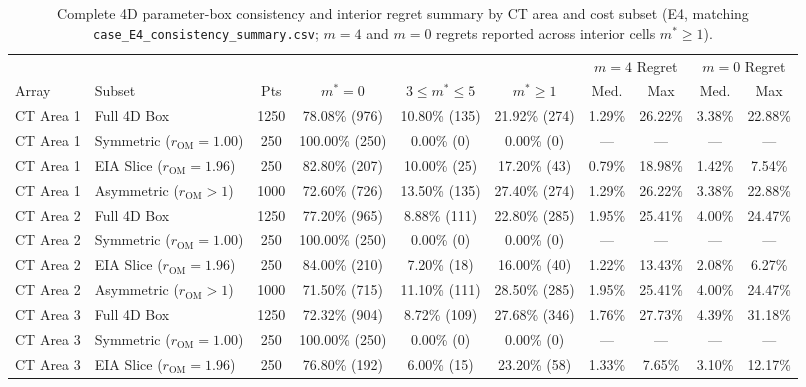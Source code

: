 \documentclass[10pt,a4paper]{article}
\begin{document}
\begin{table}[htbp]
\centering
\scriptsize
\setlength{\tabcolsep}{1.2pt}
\caption{Complete 4D parameter-box consistency and interior regret summary by CT area and cost subset (E4, matching \texttt{case\_E4\_consistency\_summary.csv}; $m=4$ and $m=0$ regrets reported across interior cells $m^* \ge 1$).}
\label{tab:S7}
\begin{tabular*}{\textwidth}{@{\extracolsep{\fill}}llcccc|cc|cc@{}}
\toprule
 & & & & & & \multicolumn{2}{c|}{$m=4$ Regret} & \multicolumn{2}{c}{$m=0$ Regret} \\
Array & Subset & Pts & $m^*=0$ & $3\le m^*\le 5$ & $m^*\ge 1$ & Med. & Max & Med. & Max \\
\midrule
CT Area 1 & Full 4D Box      & 1250 & 78.08\% (976) & 10.80\% (135) & 21.92\% (274) & 1.29\% & 26.22\% & 3.38\% & 22.88\% \\
CT Area 1 & Symmetric ($r_{\mathrm{OM}}=1.00$) & 250  & 100.00\% (250) & 0.00\% (0) & 0.00\% (0) & --- & --- & --- & --- \\
CT Area 1 & EIA Slice ($r_{\mathrm{OM}}=1.96$) & 250  & 82.80\% (207) & 10.00\% (25) & 17.20\% (43) & 0.79\% & 18.98\% & 1.42\% & 7.54\% \\
CT Area 1 & Asymmetric ($r_{\mathrm{OM}}>1$)    & 1000 & 72.60\% (726) & 13.50\% (135) & 27.40\% (274) & 1.29\% & 26.22\% & 3.38\% & 22.88\% \\
\midrule
CT Area 2 & Full 4D Box      & 1250 & 77.20\% (965) & 8.88\% (111) & 22.80\% (285) & 1.95\% & 25.41\% & 4.00\% & 24.47\% \\
CT Area 2 & Symmetric ($r_{\mathrm{OM}}=1.00$) & 250  & 100.00\% (250) & 0.00\% (0) & 0.00\% (0) & --- & --- & --- & --- \\
CT Area 2 & EIA Slice ($r_{\mathrm{OM}}=1.96$) & 250  & 84.00\% (210) & 7.20\% (18) & 16.00\% (40) & 1.22\% & 13.43\% & 2.08\% & 6.27\% \\
CT Area 2 & Asymmetric ($r_{\mathrm{OM}}>1$)    & 1000 & 71.50\% (715) & 11.10\% (111) & 28.50\% (285) & 1.95\% & 25.41\% & 4.00\% & 24.47\% \\
\midrule
CT Area 3 & Full 4D Box      & 1250 & 72.32\% (904) & 8.72\% (109) & 27.68\% (346) & 1.76\% & 27.73\% & 4.39\% & 31.18\% \\
CT Area 3 & Symmetric ($r_{\mathrm{OM}}=1.00$) & 250  & 100.00\% (250) & 0.00\% (0) & 0.00\% (0) & --- & --- & --- & --- \\
CT Area 3 & EIA Slice ($r_{\mathrm{OM}}=1.96$) & 250  & 76.80\% (192) & 6.00\% (15) & 23.20\% (58) & 1.33\% & 7.65\% & 3.10\% & 12.17\% \\

\end{tabular*}
\end{table}
\end{document}

